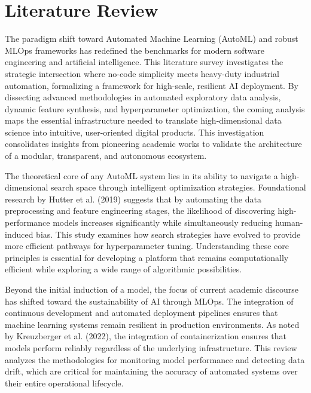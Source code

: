 \chapter{Literature Review}
\vspace{-1cm}
The paradigm shift toward Automated Machine Learning (AutoML) and robust MLOps frameworks has redefined the benchmarks for modern software engineering and artificial intelligence. This literature survey investigates the strategic intersection where no-code simplicity meets heavy-duty industrial automation, formalizing a framework for high-scale, resilient AI deployment. By dissecting advanced methodologies in automated exploratory data analysis, dynamic feature synthesis, and hyperparameter optimization, the coming analysis maps the essential infrastructure needed to translate high-dimensional data science into intuitive, user-oriented digital products. This investigation consolidates insights from pioneering academic works to validate the architecture of a modular, transparent, and autonomous ecosystem.

The theoretical core of any AutoML system lies in its ability to navigate a high-dimensional search space through intelligent optimization strategies. Foundational research by Hutter et al. (2019) suggests that by automating the data preprocessing and feature engineering stages, the likelihood of discovering high-performance models increases significantly while simultaneously reducing human-induced bias. This study examines how search strategies have evolved to provide more efficient pathways for hyperparameter tuning. Understanding these core principles is essential for developing a platform that remains computationally efficient while exploring a wide range of algorithmic possibilities.\vspace{0.4cm}

Beyond the initial induction of a model, the focus of current academic discourse has shifted toward the sustainability of AI through MLOps. The integration of continuous development and automated deployment pipelines ensures that machine learning systems remain resilient in production environments. As noted by Kreuzberger et al. (2022), the integration of containerization ensures that models perform reliably regardless of the underlying infrastructure. This review analyzes the methodologies for monitoring model performance and detecting data drift, which are critical for maintaining the accuracy of automated systems over their entire operational lifecycle.\vspace{0.4cm}

